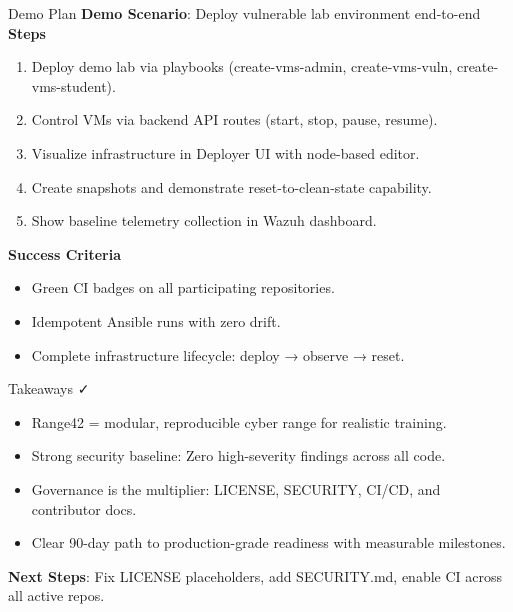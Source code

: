 \documentclass[aspectratio=169]{beamer}
\begin{document}
\begin{frame}{Demo Plan \; \faPlay}
  \textbf{Demo Scenario}: Deploy vulnerable lab environment end-to-end\\[2mm]
  
  \textbf{Steps}
  \begin{enumerate}
    \item Deploy demo lab via playbooks (create-vms-admin, create-vms-vuln, create-vms-student).
    \item Control VMs via backend API routes (start, stop, pause, resume).
    \item Visualize infrastructure in Deployer UI with node-based editor.
    \item Create snapshots and demonstrate reset-to-clean-state capability.
    \item Show baseline telemetry collection in Wazuh dashboard.
  \end{enumerate}
  
  \textbf{Success Criteria}
  \begin{itemize}
    \item Green CI badges on all participating repositories.
    \item Idempotent Ansible runs with zero drift.
    \item Complete infrastructure lifecycle: deploy → observe → reset.
  \end{itemize}
\end{frame}

\begin{frame}{Takeaways \; \faCheck}
  \begin{itemize}
    \item Range42 = modular, reproducible cyber range for realistic training.
    \item \alert{Strong security baseline}: Zero high-severity findings across all code.
    \item \alert{Governance is the multiplier}: LICENSE, SECURITY, CI/CD, and contributor docs.
    \item Clear 90-day path to production-grade readiness with measurable milestones.
  \end{itemize}
  \vspace{3mm}
  \begin{tcolorbox}
    \faLightbulb\; \textbf{Next Steps}: Fix LICENSE placeholders, add SECURITY.md, enable CI across all active repos.
  \end{tcolorbox}
\end{frame}
\end{document}
